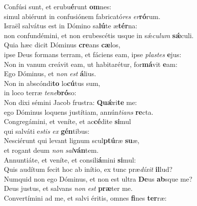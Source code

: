 \evenverse Confúsi sunt, et erubu\textbf{é}runt \textbf{om}nes:~\*\\
\evenverse simul abiérunt in confusiónem fabricató\textit{res} \textit{er}\textbf{ró}rum.\\
\oddverse Israël salvátus est in Dómino sa\textbf{lú}te æ\textbf{tér}na:~\*\\
\oddverse non confundémini, et non erubescétis usque in sǽ\textit{cu}\textit{lum} \textbf{sǽ}culi.\\
\evenverse Quia hæc dicit Dóminus \textbf{cre}ans \textbf{cæ}los,~\*\\
\evenverse ipse Deus formans terram, et fáciens eam, ipse \textit{pla}\textit{stes} \textbf{e}jus:\\
\oddverse Non in vanum creávit eam, ut habitarétur, for\textbf{má}vit \textbf{e}am:~\*\\
\oddverse Ego Dóminus, et \textit{non} \textit{est} \textbf{á}lius.\\
\evenverse Non in abscóndi\textbf{to} lo\textbf{cú}tus sum,~\*\\
\evenverse in loco terræ \textit{te}\textit{ne}\textbf{bró}so:\\
\oddverse Non dixi sémini Jacob frustra: \textbf{Quǽ}ri\textbf{te} me:~\*\\
\oddverse ego Dóminus loquens justítiam, annún\textit{ti}\textit{ans} \textbf{re}cta.\\
\evenverse Congregámini, et veníte, et ac\textbf{cé}dite \textbf{si}mul~\*\\
\evenverse qui salváti e\textit{stis} \textit{ex} \textbf{gén}tibus:\\
\oddverse Nesciérunt qui levant lignum scul\textbf{ptú}ræ \textbf{su}æ,~\*\\
\oddverse et rogant deum \textit{non} \textit{sal}\textbf{ván}tem.\\
\evenverse Annuntiáte, et veníte, et consili\textbf{á}mini \textbf{si}mul:~\*\\
\evenverse Quis audítum fecit hoc ab inítio, ex tunc præ\textit{dí}\textit{xit} \textbf{il}lud?\\
\oddverse Numquid non ego Dóminus, et non est ultra \textbf{De}us \textbf{ab}sque me?~\*\\
\oddverse Deus justus, et salvans \textit{non} \textit{est} \textbf{præ}ter me.\\
\evenverse Convertímini ad me, et salvi éritis, omnes \textbf{fi}nes \textbf{ter}ræ:~\*\\
